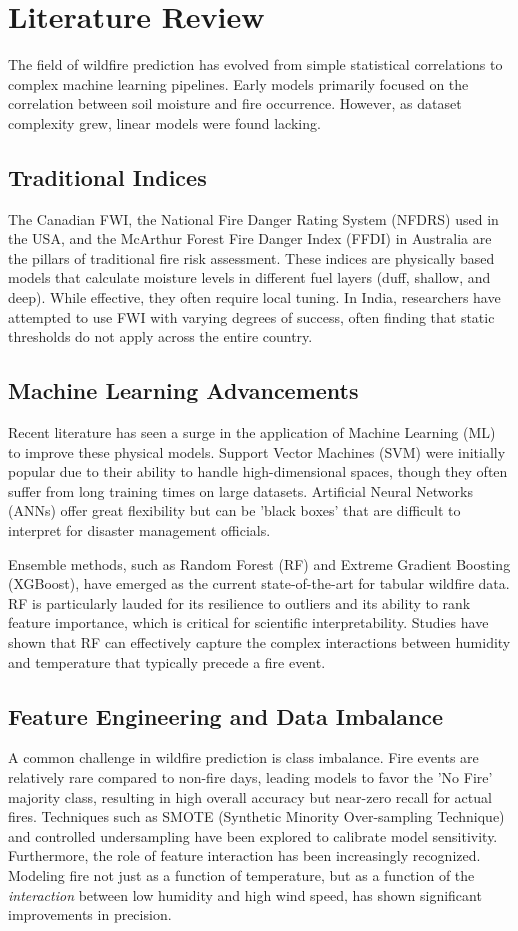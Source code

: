 \documentclass[conference]{IEEEtran}
\begin{document}
\section{Literature Review}
The field of wildfire prediction has evolved from simple statistical correlations to complex machine learning pipelines. Early models primarily focused on the correlation between soil moisture and fire occurrence. However, as dataset complexity grew, linear models were found lacking.

\subsection{Traditional Indices}
The Canadian FWI, the National Fire Danger Rating System (NFDRS) used in the USA, and the McArthur Forest Fire Danger Index (FFDI) in Australia are the pillars of traditional fire risk assessment. These indices are physically based models that calculate moisture levels in different fuel layers (duff, shallow, and deep). While effective, they often require local tuning. In India, researchers have attempted to use FWI with varying degrees of success, often finding that static thresholds do not apply across the entire country.

\subsection{Machine Learning Advancements}
Recent literature has seen a surge in the application of Machine Learning (ML) to improve these physical models. Support Vector Machines (SVM) were initially popular due to their ability to handle high-dimensional spaces, though they often suffer from long training times on large datasets. Artificial Neural Networks (ANNs) offer great flexibility but can be 'black boxes' that are difficult to interpret for disaster management officials.

Ensemble methods, such as Random Forest (RF) and Extreme Gradient Boosting (XGBoost), have emerged as the current state-of-the-art for tabular wildfire data. RF is particularly lauded for its resilience to outliers and its ability to rank feature importance, which is critical for scientific interpretability. Studies have shown that RF can effectively capture the complex interactions between humidity and temperature that typically precede a fire event.

\subsection{Feature Engineering and Data Imbalance}
A common challenge in wildfire prediction is class imbalance. Fire events are relatively rare compared to non-fire days, leading models to favor the 'No Fire' majority class, resulting in high overall accuracy but near-zero recall for actual fires. Techniques such as SMOTE (Synthetic Minority Over-sampling Technique) and controlled undersampling have been explored to calibrate model sensitivity. Furthermore, the role of feature interaction has been increasingly recognized. Modeling fire not just as a function of temperature, but as a function of the \textit{interaction} between low humidity and high wind speed, has shown significant improvements in precision.
\end{document}
